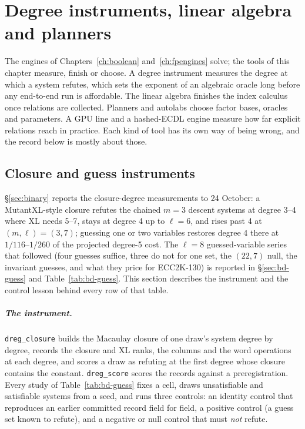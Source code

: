 \chapter{Degree instruments, linear algebra and planners}\label{ch:instruments}

The engines of Chapters~\ref{ch:boolean} and~\ref{ch:fpengines} solve; the
tools of this chapter measure, finish or choose. A degree instrument
measures the degree at which a system refutes, which sets the exponent of an
algebraic oracle long before any end-to-end run is affordable. The linear
algebra finishes the index calculus once relations are collected. Planners
and autolabs choose factor bases, oracles and parameters. A GPU line and a
hashed-ECDL engine measure how far explicit relations reach in practice.
Each kind of tool has its own way of being wrong, and the record below is
mostly about those.

\section{Closure and guess instruments}\label{sec:in-closure}

\S\ref{sec:binary} reports the closure-degree measurements to 24 October: a
MutantXL-style closure refutes the chained $m=3$ descent systems at degree
3--4 where XL needs 5--7, stays at degree 4 up to $\ell=6$, and rises past 4
at $(m,\ell)=(3,7)$; guessing one or two variables restores degree 4 there at
$1/116$--$1/260$ of the projected degree-5 cost. The $\ell=8$ guessed-variable
series that followed (four guesses suffice, three do not for one set, the
$(22,7)$ null, the invariant guesses, and what they price for ECC2K-130) is
reported in \S\ref{sec:bd-guess} and Table~\ref{tab:bd-guess}. This section
describes the instrument and the control lesson behind every row of that
table.

\paragraph{The instrument.} \texttt{dreg\_closure} builds the Macaulay
closure of one draw's system degree by degree, records the closure and XL
ranks, the columns and the word operations at each degree, and scores a draw
as refuting at the first degree whose closure contains the constant.
\texttt{dreg\_score} scores the records against a preregistration. Every
study of Table~\ref{tab:bd-guess} fixes a cell, draws unsatisfiable and satisfiable systems from a
seed, and runs three controls: an identity control that reproduces an
earlier committed record field for field, a positive control (a guess set
known to refute), and a negative or null control that must \emph{not}
refute.

